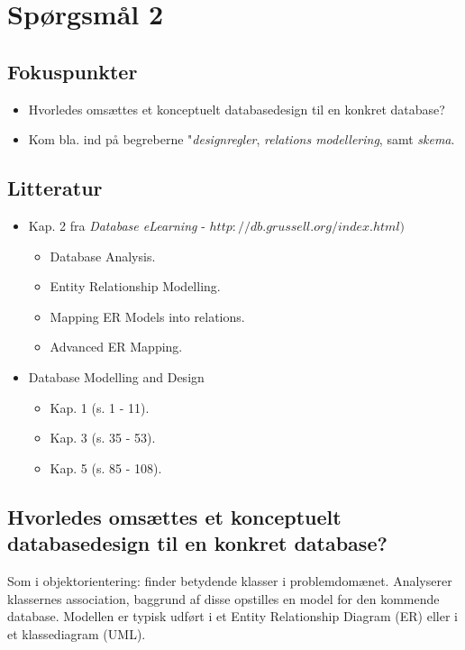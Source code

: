 \section{Spørgsmål 2}

\subsection{Fokuspunkter}
\begin{itemize}
	\item Hvorledes omsættes et konceptuelt databasedesign til en konkret database?
	\item Kom bla. ind på begreberne "\textit{designregler}, \textit{relations modellering}, samt \textit{skema}.
\end{itemize}

\subsection{Litteratur}
\begin{itemize}
	\item Kap. 2 fra \textit{Database eLearning} - $http://db.grussell.org/index.html)$
	\begin{itemize}
		\item Database Analysis.
		\item Entity Relationship Modelling.
		\item Mapping ER Models into relations.
		\item Advanced ER Mapping.
	\end{itemize}
	\item Database Modelling and Design
	\begin{itemize}
		\item Kap. 1 (s. 1 - 11).
		\item Kap. 3 (s. 35 - 53).
		\item Kap. 5 (s. 85 - 108).
	\end{itemize}
\end{itemize}

\newpage

\subsection{Hvorledes omsættes et konceptuelt databasedesign til en konkret database?}
Som i objektorientering: finder
betydende klasser i problemdomænet. Analyserer klassernes association, baggrund af disse opstilles en model for den kommende database. Modellen er typisk udført i et Entity Relationship Diagram (ER) eller i et klassediagram (UML).

